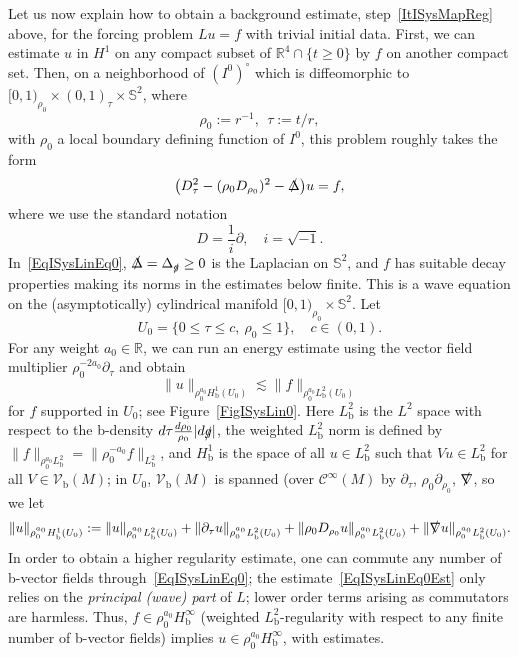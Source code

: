 \documentclass[reqno,11pt,letterpaper]{amsart}
\numberwithin{equation}{section}
\numberwithin{figure}{section}
\theoremstyle{definition}
\theoremstyle{remark}
\newcommand{\mc}{\mathcal}
\newcommand{\cC}{\mc C}
\newcommand{\R}{\mathbb{R}}
\newcommand{\Sph}{\mathbb{S}}
\newcommand{\slg}{\slashed{g}{}}
\newcommand{\slDelta}{\slashed{\Delta}{}}
\newcommand{\slnabla}{\slashed{\nabla}{}}
\newcommand{\pa}{\partial}
\newcommand{\bop}{{\mathrm{b}}}
\newcommand{\Vf}{\mathcal V}
\newcommand{\Vb}{\Vf_\bop}
\newcommand{\CI}{\cC^\infty}
\newcommand{\Hb}{H_{\bop}}
\begin{document}
Let us now explain how to obtain a background estimate, step~\ref{ItISysMapReg} above, for the forcing problem $L u=f$ with trivial initial data. First, we can estimate $u$ in $H^1$ on any compact subset of $\R^4\cap\{t\geq 0\}$ by $f$ on another compact set. Then, on a neighborhood of $(I^0)^\circ$ which is diffeomorphic to $[0,1)_{\rho_0}\times(0,1)_\tau\times\Sph^2$, where
\[
  \rho_0 := r^{-1},\ \ \tau:= t/r,
\]
with $\rho_0$ a local boundary defining function of $I^0$, this problem roughly takes the form
\begin{equation}
\label{EqISysLinEq0}
  \bigl(D_\tau^2 - (\rho_0 D_{\rho_0})^2-\slDelta\bigr)u = f,
\end{equation}
where we use the standard notation
\begin{equation}
\label{EqISysLinD}
  D = \frac{1}{i}\pa,\quad i=\sqrt{-1}.
\end{equation}
In~\eqref{EqISysLinEq0}, $\slDelta=\Delta_{\slg}\geq 0$ is the Laplacian on $\Sph^2$, and $f$ has suitable decay properties making its norms in the estimates below finite. This is a wave equation on the (asymptotically) cylindrical manifold $[0,1)_{\rho_0}\times\Sph^2$. Let
\[
  U_0=\{0\leq\tau\leq c,\ \rho_0\leq 1\},\quad c\in(0,1).
\]
For any weight $a_0\in\R$, we can run an energy estimate using the vector field multiplier $\rho_0^{-2 a_0}\pa_\tau$ and obtain
\begin{equation}
\label{EqISysLinEq0Est}
  \| u \|_{\rho_0^{a_0}\Hb^1(U_0)} \lesssim \| f \|_{\rho_0^{a_0}L^2_\bop(U_0)}
\end{equation}
for $f$ supported in $U_0$; see Figure~\ref{FigISysLin0}. Here $L^2_\bop$ is the $L^2$ space with respect to the b-density $d\tau\frac{d\rho_0}{\rho_0}|d\slg|$, the weighted $L^2_\bop$ norm is defined by $\|f\|_{\rho_0^{a_0}L^2_\bop}=\|\rho_0^{-a_0}f\|_{L^2_\bop}$, and $\Hb^1$ is the space of all $u\in L^2_\bop$ such that $V u\in L^2_\bop$ for all $V\in\Vb(M)$; in $U_0$, $\Vb(M)$ is spanned (over $\CI(M)$ by $\pa_\tau$, $\rho_0\pa_{\rho_0}$, $\slnabla$, so we let
\[
  \|u\|_{\rho_0^{a_0}\Hb^1(U_0)} := \|u\|_{\rho_0^{a_0}L^2_\bop(U_0)} + \|\pa_\tau u\|_{\rho_0^{a_0}L^2_\bop(U_0)} + \|\rho_0 D_{\rho_0}u\|_{\rho_0^{a_0}L^2_\bop(U_0)} + \|\slnabla u\|_{\rho_0^{a_0}L^2_\bop(U_0)}.
\]
In order to obtain a higher regularity estimate, one can commute any number of b-vector fields through~\eqref{EqISysLinEq0}; the estimate~\eqref{EqISysLinEq0Est} only relies on the \emph{principal (wave) part} of $L$; lower order terms arising as commutators are harmless. Thus, $f\in\rho_0^{a_0}\Hb^\infty$ (weighted $L^2_\bop$-regularity with respect to any finite number of b-vector fields) implies $u\in\rho_0^{a_0}\Hb^\infty$, with estimates.
\end{document}
